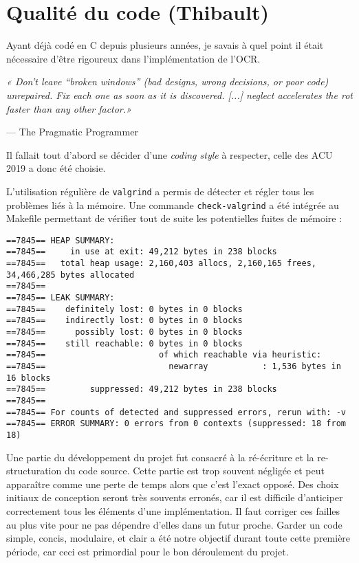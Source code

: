 \chapter{Qualité du code (Thibault)}

Ayant déjà codé en C depuis plusieurs années, je savais à quel point il était
nécessaire d'être rigoureux dans l'implémentation de l'OCR.

\epigraph{\textit{« Don't leave “broken windows” (bad designs, wrong decisions,
or poor code) unrepaired. Fix each one as soon as it is discovered.  [...]
neglect accelerates the rot faster than any other factor.»}}{--- \textup{The
Pragmatic Programmer}}

Il fallait tout d'abord se décider d'une \textit{coding style} à respecter,
celle des ACU 2019 a donc été choisie.

L'utilisation régulière de \texttt{valgrind} a permis de détecter et
régler tous les problèmes liés à la mémoire. Une commande
\texttt{check-valgrind} a été intégrée au Makefile permettant de
vérifier tout de suite les potentielles fuites de mémoire :

\begin{scriptsize}
\begin{verbatim}
==7845== HEAP SUMMARY:
==7845==     in use at exit: 49,212 bytes in 238 blocks
==7845==   total heap usage: 2,160,403 allocs, 2,160,165 frees, 34,466,285 bytes allocated
==7845==
==7845== LEAK SUMMARY:
==7845==    definitely lost: 0 bytes in 0 blocks
==7845==    indirectly lost: 0 bytes in 0 blocks
==7845==      possibly lost: 0 bytes in 0 blocks
==7845==    still reachable: 0 bytes in 0 blocks
==7845==                       of which reachable via heuristic:
==7845==                         newarray           : 1,536 bytes in 16 blocks
==7845==         suppressed: 49,212 bytes in 238 blocks
==7845==
==7845== For counts of detected and suppressed errors, rerun with: -v
==7845== ERROR SUMMARY: 0 errors from 0 contexts (suppressed: 18 from 18)
\end{verbatim}
\end{scriptsize}

\newpage

Une partie du développement du projet fut consacré à la ré-écriture et la
re-structuration du code source. Cette partie est trop souvent négligée et peut
apparaître comme une perte de temps alors que c'est l'exact opposé. Des choix
initiaux de conception seront très souvents erronés, car il est difficile
d'anticiper correctement tous les éléments d'une implémentation. Il faut
corriger ces failles au plus vite pour ne pas dépendre d'elles dans un futur
proche. Garder un code simple, concis, modulaire, et clair a été notre objectif
durant toute cette première période, car ceci est primordial pour le bon
déroulement du projet.
